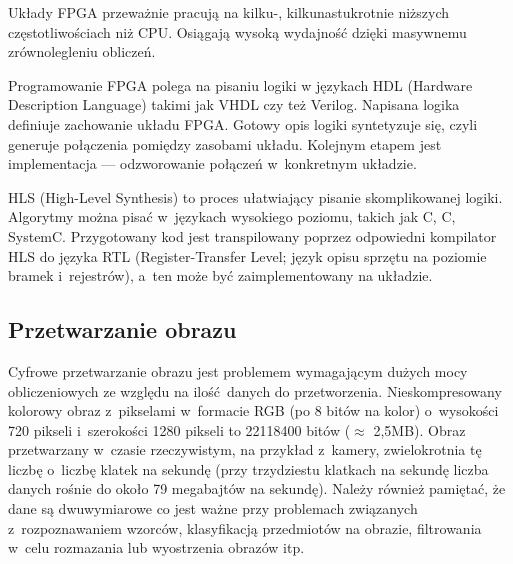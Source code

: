\documentclass[12pt, oneside, a4paper]{article}
\def\CPP{{C\nolinebreak[4]\hspace{-.05em}\raisebox{.4ex}{\tiny\bf ++}}}
\begin{document}
Układy FPGA przeważnie pracują na kilku-, kilkunastukrotnie niższych
częstotliwościach niż CPU. Osiągają wysoką wydajność
dzięki masywnemu zrównolegleniu obliczeń.

Programowanie FPGA polega na pisaniu logiki
w językach HDL (Hardware Description Language) takimi jak VHDL 
czy też Verilog. Napisana logika definiuje zachowanie układu FPGA.
Gotowy opis logiki syntetyzuje się, czyli generuje połączenia pomiędzy
zasobami układu. Kolejnym etapem jest implementacja --- odzworowanie
połączeń w~konkretnym układzie.
 
HLS (High-Level Synthesis) to proces ułatwiający pisanie skomplikowanej
logiki. Algorytmy można pisać w~językach wysokiego poziomu, takich jak
C, \CPP, SystemC. Przygotowany kod jest transpilowany poprzez odpowiedni
kompilator HLS do języka RTL (Register-Transfer Level; język opisu sprzętu
na poziomie bramek i~rejestrów), a~ten może być zaimplementowany na układzie.

\subsection{Przetwarzanie obrazu}\label{sec:Przetwarzanie obrazu}
Cyfrowe przetwarzanie obrazu jest problemem wymagającym dużych mocy
obliczeniowych ze względu na ilość danych do przetworzenia. Nieskompresowany
kolorowy obraz z~pikselami w~formacie RGB (po 8 bitów na kolor) o~wysokości
720 pikseli i~szerokości 1280 pikseli to 22118400 bitów (\(\approx \) 2,5MB). Obraz
przetwarzany w~czasie rzeczywistym, na przykład z~kamery, zwielokrotnia tę
liczbę o~liczbę klatek na sekundę (przy trzydziestu klatkach na sekundę liczba
danych rośnie do około 79 megabajtów na sekundę). Należy również pamiętać, że
dane są dwuwymiarowe co jest ważne przy problemach związanych z~rozpoznawaniem
wzorców, klasyfikacją przedmiotów na obrazie, filtrowania w~celu rozmazania lub
wyostrzenia obrazów itp.
\end{document}
